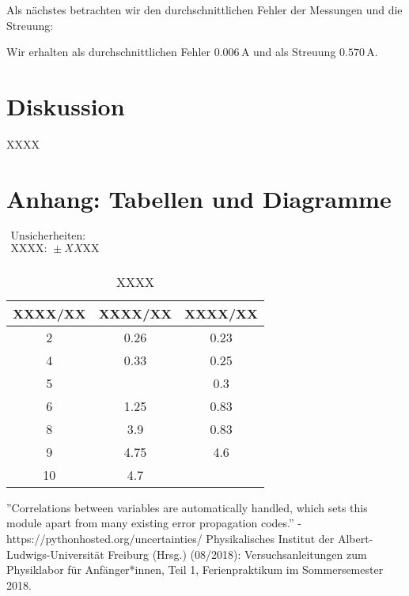 \documentclass[11pt,a4paper]{article}
\begin{document}
Als n\"achstes betrachten wir den durchschnittlichen Fehler der Messungen und die Streuung:

Wir erhalten als durchschnittlichen Fehler $0.006\,$A und als Streuung $0.570\,$A.

\section{Diskussion}

XXXX

\pagebreak

\section{Anhang: Tabellen und Diagramme}

\begin{table}[h]
\centering
\caption{XXXX} \vspace{11pt}
$\begin{array}{l}
\textrm{Unsicherheiten:}\\
\textrm{XXXX: } \pm XX \textrm{XX}\\
\end{array}$
\begin{tabular}{ccc}
\toprule
\textrm{XXXX}/\textrm{XX} & \textrm{XXXX}/\textrm{XX} & \textrm{XXXX}/\textrm{XX} \\
\midrule 
2 & 0.26 & 0.23\\
\hline
4 & 0.33 & 0.25\\
\hline 
5 & & 0.3\\
\hline 
6 & 1.25 & 0.83\\
\hline 
8 & 3.9 & 0.83\\ 
\hline
9 & 4.75 & 4.6\\ 
\hline
10 & 4.7 &\\ 
\bottomrule
\end{tabular}
\label{Tab:X}
\end{table}


\begin{thebibliography}{9}
''Correlations between variables are automatically handled, which sets this module apart from many existing error propagation codes.'' - https://pythonhosted.org/uncertainties/
 Physikalisches Institut der Albert-Ludwigs-Universität Freiburg (Hrsg.) (08/2018): Versuchsanleitungen zum Physiklabor für Anfänger*innen, Teil 1, Ferienpraktikum im Sommersemester 2018.
\end{thebibliography}
\end{document}
